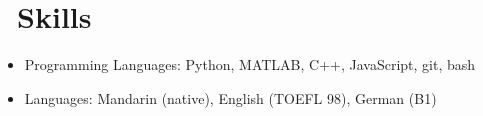 \documentclass{resume}
\begin{document}
\section{\faCogs\ Skills}

\begin{itemize}[parsep=0.5ex]
  \item Programming Languages: Python, MATLAB, C++, JavaScript, git, bash
  \item Languages: Mandarin (native), English (TOEFL 98), German (B1)
\end{itemize}






%
%
\end{document}
